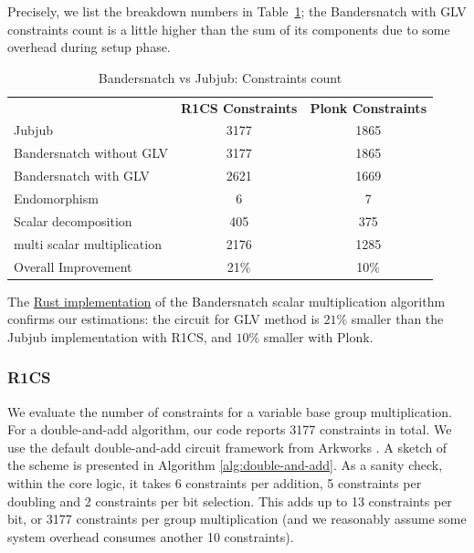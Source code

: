 \documentclass[version=preprint]{iacrcc}
\begin{document}
Precisely, we list the breakdown numbers in Table~\ref{tab:r1cs_full};
the  Bandersnatch with GLV constraints count is a little higher than
the sum of its components due to some overhead during setup phase.


\begin{table}[!ht]
  \centering%
  \begin{tabularx}{\textwidth}{lcc}
    & \textbf{R1CS Constraints}     & \textbf{Plonk Constraints}\\
    Jubjub& 3177 & 1865\\
    Bandersnatch without GLV& 3177 & 1865\\

    Bandersnatch with GLV&  2621&1669\\
    \quad Endomorphism & 6 & 7 \\
    \quad Scalar decomposition &  405 & 375\\
    \quad multi scalar multiplication & 2176& 1285 \\
    Overall Improvement & 21\%  & 10\% \\
  \end{tabularx}
  \caption{Bandersnatch vs Jubjub: Constraints count}
  \label{tab:r1cs_full}
\end{table}


The \href{https://github.com/zhenfeizhang/bandersnatch}{Rust implementation} of the Bandersnatch scalar multiplication
algorithm confirms our estimations: the circuit for GLV method is $21\%$ smaller
than the Jubjub implementation with R1CS, and $10\%$ smaller with Plonk.

\subsubsection{R1CS}
We evaluate the number of constraints for a 
variable base group multiplication. For a double-and-add
algorithm, 
our code reports 3177 constraints in 
total.
We use the default double-and-add circuit framework from Arkworks \cite{arkworks}.
A sketch of the scheme is presented in Algorithm \ref{alg:double-and-add}.
As a sanity check, within the core logic,
it takes 6 constraints per addition, 5 constraints
per doubling and 2 constraints per bit selection. This adds
up to 13 constraints per bit, or 3177 constraints per
group multiplication (and we reasonably assume some system overhead
consumes another 10 constraints). 
\end{document}
